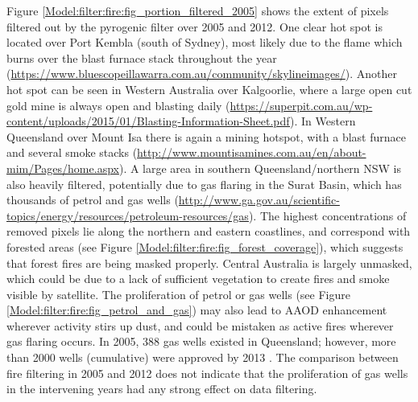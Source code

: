     
    
    
    Figure \ref{Model:filter:fire:fig_portion_filtered_2005} shows the extent of pixels filtered out by the pyrogenic filter over 2005 and 2012.
    One clear hot spot is located over Port Kembla (south of Sydney), most likely due to the flame which burns over the blast furnace stack throughout the year (\url{https://www.bluescopeillawarra.com.au/community/skylineimages/}).
    Another hot spot can be seen in Western Australia over Kalgoorlie, where a large open cut gold mine is always open and blasting daily (\url{https://superpit.com.au/wp-content/uploads/2015/01/Blasting-Information-Sheet.pdf}).
    In Western Queensland over Mount Isa there is again a mining hotspot, with a blast furnace and several smoke stacks (\url{http://www.mountisamines.com.au/en/about-mim/Pages/home.aspx}).
    A large area in southern Queensland/northern NSW is also heavily filtered, potentially due to gas flaring in the Surat Basin, which has thousands of petrol and gas wells (\url{http://www.ga.gov.au/scientific-topics/energy/resources/petroleum-resources/gas}).
    The highest concentrations of removed pixels lie along the northern and eastern coastlines, and correspond with forested areas (see Figure \ref{Model:filter:fire:fig_forest_coverage}), which suggests that forest fires are being masked properly.
    Central Australia is largely unmasked, which could be due to a lack of sufficient vegetation to create fires and smoke visible by satellite.
    The proliferation of petrol or gas wells (see Figure \ref{Model:filter:fire:fig_petrol_and_gas}) may also lead to AAOD enhancement wherever activity stirs up dust, and could be mistaken as active fires wherever gas flaring occurs.
    In 2005, 388 gas wells existed in Queensland; however, more than 2000 wells (cumulative) were approved by 2013 \parencite{Carlisle2012}.
    The comparison between fire filtering in 2005 and 2012 does not indicate that the proliferation of gas wells in the intervening years had any strong effect on data filtering. 
    
